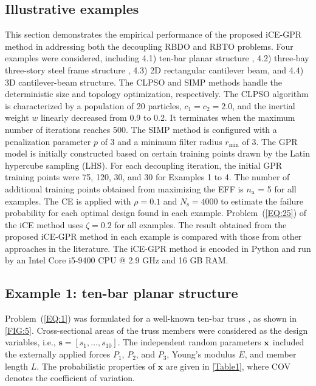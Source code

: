 \documentclass[preprint,3p]{elsarticle}
\begin{document}
\begin{linenumbers}
\section{Illustrative examples}
\label{sec4}
This section demonstrates the empirical performance of the proposed iCE-GPR method in addressing both the decoupling RBDO and RBTO problems.
Four examples were considered, including 4.1) ten-bar planar structure \cite{Zhao2013}, 4.2) three-bay three-story steel frame structure \cite{Xu2019}, 4.3) 2D rectangular cantilever beam, and 4.4) 3D cantilever-beam structure.
The CLPSO and SIMP methods handle the deterministic size and topology optimization, respectively.
The CLPSO algorithm is characterized by a population of 20 particles, $c_1 = c_2 = 2.0$, and the inertial weight $w$ linearly decreased from 0.9 to 0.2. It terminates when the maximum number of iterations reaches 500.
The SIMP method is configured with a penalization parameter $p$ of 3 and a minimum filter radius $r_\text{min}$ of 3. The GPR model is initially constructed based on certain training points drawn by the Latin hypercube sampling (LHS). For each decoupling iteration, the initial GPR training points were 75, 120, 30, and 30 for Examples 1 to 4. The number of additional training points obtained from maximizing the EFF is $n_\text{a}$ = 5 for all examples. The CE is applied with $\rho = 0.1$ and $N_\text{s} = 4000$ to estimate the failure probability for each optimal design found in each example. Problem~(\ref{EQ:25}) of the iCE method uses $\zeta = 0.2$ for all examples. The result obtained from the proposed iCE-GPR method in each example is compared with those from other approaches in the literature. The iCE-GPR method is encoded in Python and run by an Intel Core i5-9400 CPU @ 2.9 GHz and 16 GB RAM.

\subsection{Example 1: ten-bar planar structure}\label{SUBSEC:41}
Problem~(\ref{EQ:1}) was formulated for a well-known ten-bar truss \cite{Zhao2013}, as shown in \cref{FIG:5}. Cross-sectional areas of the truss members were considered as the design variables, i.e., $\textbf{s}=[s_1,\dots,s_{10}]$. The independent random parameters ${\bf x}$ included the externally applied forces $P_1$,
$P_2$, and $P_3$, Young's modulus $E$, and member length $L$. The
probabilistic properties of $\textbf{x}$ are given in \cref{Table1}, where COV denotes the coefficient of variation.


\end{linenumbers}
\end{document}
